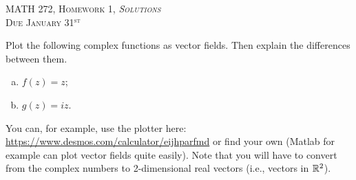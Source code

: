 \documentclass[12pt]{article} %
\begin{document}
\begin{center}
   \textsc{\large MATH 272, Homework 1, \emph{Solutions}}\\
   \textsc{Due January 31$^\textrm{st}$}
\end{center}
\vspace{.5cm}

\begin{problem}
	Plot the following complex functions as vector fields. Then explain the differences between them.
	\begin{enumerate}[(a)]
		\item $f(z) = z$;
		\item $g(z)=iz$.
	\end{enumerate}
You can, for example, use the plotter here: \url{https://www.desmos.com/calculator/eijhparfmd} or find your own (Matlab for example can plot vector fields quite easily). Note that you will have to convert from the complex numbers to 2-dimensional real vectors (i.e., vectors in $\mathbb{R}^2$).  
\end{problem}
\end{document}
